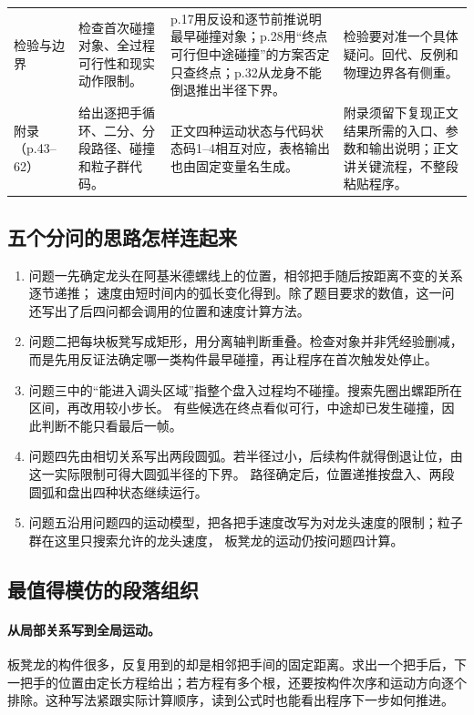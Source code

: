 \documentclass[UTF8,zihao=-4]{ctexart}
\begin{document}
\begin{longtable}{p{2.25cm}p{4.0cm}p{5.1cm}p{4.2cm}}
检验与边界
& 检查首次碰撞对象、全过程可行性和现实动作限制。
& p.17用反设和逐节前推说明最早碰撞对象；p.28用“终点可行但中途碰撞”的方案否定只查终点；p.32从龙身不能倒退推出半径下界。
& 检验要对准一个具体疑问。回代、反例和物理边界各有侧重。\\

附录（p.43--62）
& 给出逐把手循环、二分、分段路径、碰撞和粒子群代码。
& 正文四种运动状态与代码状态码1--4相互对应，表格输出也由固定变量名生成。
& 附录须留下复现正文结果所需的入口、参数和输出说明；正文讲关键流程，不整段粘贴程序。\\
\end{longtable}
\normalsize

\subsection{五个分问的思路怎样连起来}

\begin{enumerate}
  \item 问题一先确定龙头在阿基米德螺线上的位置，相邻把手随后按距离不变的关系逐节递推；
  速度由短时间内的弧长变化得到。除了题目要求的数值，这一问还写出了后四问都会调用的位置和速度计算方法。
  \item 问题二把每块板凳写成矩形，用分离轴判断重叠。检查对象并非凭经验删减，
  而是先用反证法确定哪一类构件最早碰撞，再让程序在首次触发处停止。
  \item 问题三中的“能进入调头区域”指整个盘入过程均不碰撞。搜索先圈出螺距所在区间，再改用较小步长。
  有些候选在终点看似可行，中途却已发生碰撞，因此判断不能只看最后一帧。
  \item 问题四先由相切关系写出两段圆弧。若半径过小，后续构件就得倒退让位，由这一实际限制可得大圆弧半径的下界。
  路径确定后，位置递推按盘入、两段圆弧和盘出四种状态继续运行。
  \item 问题五沿用问题四的运动模型，把各把手速度改写为对龙头速度的限制；粒子群在这里只搜索允许的龙头速度，
  板凳龙的运动仍按问题四计算。
\end{enumerate}

\subsection{最值得模仿的段落组织}

\paragraph{从局部关系写到全局运动。}
板凳龙的构件很多，反复用到的却是相邻把手间的固定距离。求出一个把手后，下一把手的位置由定长方程给出；若方程有多个根，还要按构件次序和运动方向逐个排除。这种写法紧跟实际计算顺序，读到公式时也能看出程序下一步如何推进。
\end{document}
